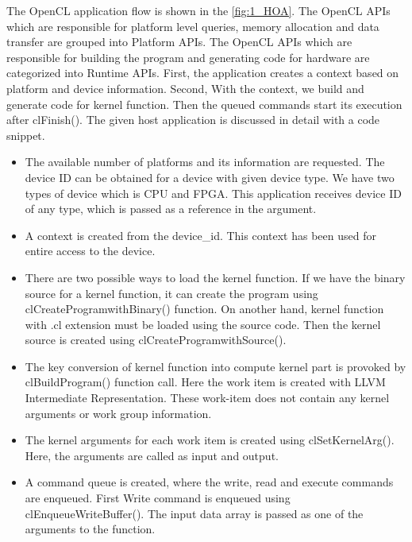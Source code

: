 The OpenCL application flow is shown in the \ref{fig:1_HOA}. The OpenCL APIs which are responsible for platform level queries, memory allocation and data transfer are grouped into Platform APIs. The OpenCL APIs which are responsible for building the program and generating code for hardware are categorized into Runtime APIs. First, the application creates a context based on platform and device information. Second, With the context, we build and generate code for kernel function. Then the queued commands start its execution after clFinish(). The given host application is discussed in detail with a code snippet.


\begin{itemize}
	\item The available number of platforms and its information are requested. The device ID can be obtained for a device with given device type. We have two types of device which is CPU and FPGA. This application receives device ID of any type, which is passed as a reference in the argument.
	
	\item A context is created from the device\_id. This context has been used for entire access to the device. 
	\item There are two possible ways to load the kernel function. If we have the binary source for a kernel function, it can create the program using clCreateProgramwithBinary() function. On another hand, kernel function with .cl extension must be loaded using the source code. Then the kernel source is created using clCreateProgramwithSource(). 
	\item The key conversion of kernel function into compute kernel part is provoked by clBuildProgram() function call. Here the work item is created with LLVM Intermediate Representation. These work-item does not contain any kernel arguments or work group information. 
	
	\item The kernel arguments for each work item is created using clSetKernelArg(). Here, the arguments are called as input and output. 
	\item A command queue is created, where the write, read and execute commands are enqueued. First Write command is enqueued using clEnqueueWriteBuffer(). The input data array is passed as one of the arguments to the function.

\end{itemize}
